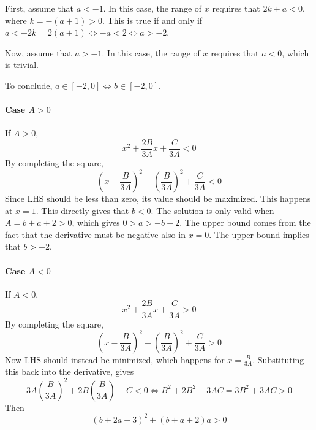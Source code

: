 \documentclass[a4paper, 11pt]{scrartcl}
\begin{document}
First, assume that $a < -1$. In this case, the range of $x$ requires that $2k + a < 0$, where $k = -(a + 1) > 0$. This is true if and only if $a < -2k = 2(a + 1) \iff -a < 2 \iff a > -2$.

Now, assume that $a > -1$. In this case, the range of $x$ requires that $a < 0$, which is trivial.

To conclude, $a\in[-2, 0] \iff b\in[-2, 0]$.


\paragraph{Case $A>0$}
If $A>0$,
\[
x^2 +\frac{2B}{3A}x + \frac{C}{3A} < 0
\]
By completing the square,
\[
 \left(x - \frac{B}{3A}\right)^2 - \left(\frac{B}{3A}\right)^2 + \frac{C}{3A} < 0
\]
Since LHS should be less than zero, its value should be maximized. This happens at $x = 1$. This directly gives that $b < 0$. The solution is only valid when $A = b+a+2 > 0$, which gives $0 > a > -b - 2$. The upper bound comes from the fact that the derivative must be negative also in $x = 0$. The upper bound implies that $b > -2$.

\paragraph{Case $A < 0$} If $A < 0$,
\[
x^2 +\frac{2B}{3A}x + \frac{C}{3A} > 0
\]
By completing the square,
\[
 \left(x - \frac{B}{3A}\right)^2 - \left(\frac{B}{3A}\right)^2 + \frac{C}{3A} > 0
\]
Now LHS should instead be minimized, which happens for $x = \frac{B}{3A}$. Substituting this back into the derivative, gives
\[
 3A\left(\frac{B}{3A}\right)^2 + 2B\left(\frac{B}{3A}\right) + C < 0 \iff B^2 + 2B^2 + 3AC = 3B^2 + 3AC > 0
\]
Then
\[
(b+2a+3)^2 + (b+a+2)a > 0
\]
\end{document}
